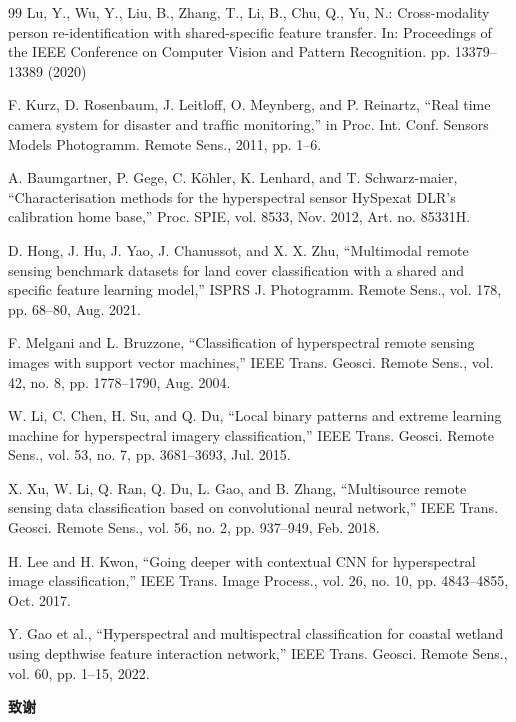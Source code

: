 \documentclass[UTF8,zihao=-4]{oucart}
\begin{document}
\begin{thebibliography}{99}
    Lu, Y., Wu, Y., Liu, B., Zhang, T., Li, B., Chu, Q., Yu, N.: Cross-modality person re-identification with shared-specific feature transfer. In: Proceedings of the IEEE Conference on Computer Vision and Pattern Recognition. pp. 13379–13389 (2020)

    F. Kurz, D. Rosenbaum, J. Leitloff, O. Meynberg, and P. Reinartz, “Real time camera system for disaster and trafﬁc monitoring,” in Proc. Int. Conf. Sensors Models Photogramm. Remote Sens., 2011, pp. 1–6.

    A. Baumgartner, P. Gege, C. Köhler, K. Lenhard, and T. Schwarz-maier, “Characterisation methods for the hyperspectral sensor HySpexat DLR’s calibration home base,” Proc. SPIE, vol. 8533, Nov. 2012, Art. no. 85331H.

    D. Hong, J. Hu, J. Yao, J. Chanussot, and X. X. Zhu, “Multimodal remote sensing benchmark datasets for land cover classiﬁcation with a shared and speciﬁc feature learning model,” ISPRS J. Photogramm. Remote Sens., vol. 178, pp. 68–80, Aug. 2021.

    F. Melgani and L. Bruzzone, “Classification of hyperspectral remote sensing images with support vector machines,” IEEE Trans. Geosci. Remote Sens., vol. 42, no. 8, pp. 1778–1790, Aug. 2004.

    W. Li, C. Chen, H. Su, and Q. Du, “Local binary patterns and extreme learning machine for hyperspectral imagery classification,” IEEE Trans. Geosci. Remote Sens., vol. 53, no. 7, pp. 3681–3693, Jul. 2015.

    X. Xu, W. Li, Q. Ran, Q. Du, L. Gao, and B. Zhang, “Multisource remote sensing data classification based on convolutional neural network,” IEEE Trans. Geosci. Remote Sens., vol. 56, no. 2, pp. 937–949, Feb. 2018.

    H. Lee and H. Kwon, “Going deeper with contextual CNN for hyperspectral image classification,” IEEE Trans. Image Process., vol. 26, no. 10, pp. 4843–4855, Oct. 2017.

    Y. Gao et al., “Hyperspectral and multispectral classification for coastal wetland using depthwise feature interaction network,” IEEE Trans. Geosci. Remote Sens., vol. 60, pp. 1–15, 2022.

\end{thebibliography}
\newpage

\begin{center}
     \textbf{致谢} \\
\end{center}
\end{document}
